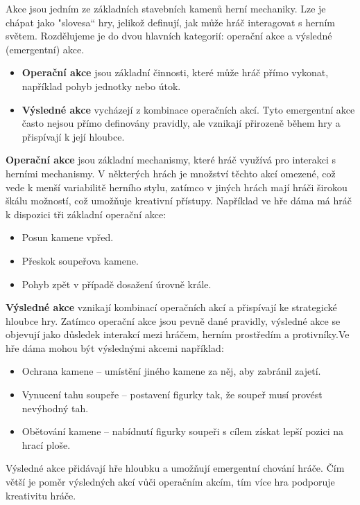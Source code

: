 Akce jsou jedním ze základních stavebních kamenů herní mechaniky. Lze je chápat jako "slovesa“ hry, jelikož definují, jak může hráč interagovat s herním světem. Rozdělujeme je do dvou hlavních kategorií: operační akce a výsledné (emergentní) akce.

\begin{itemize}
    \item \textbf{Operační akce} jsou základní činnosti, které může hráč přímo vykonat, například pohyb jednotky nebo útok.
    \item \textbf{Výsledné akce} vycházejí z kombinace operačních akcí. Tyto emergentní akce často nejsou přímo definovány pravidly, ale vznikají přirozeně během hry a přispívají k její hloubce.
\end{itemize}

\textbf{Operační akce} jsou základní mechanismy, které hráč využívá pro interakci s herními mechanismy. V některých hrách je množství těchto akcí omezené, což vede k menší variabilitě herního stylu, zatímco v jiných hrách mají hráči širokou škálu možností, což umožňuje kreativní přístupy. Například ve hře dáma má hráč k dispozici tři základní operační akce:
\begin{itemize}
    \item Posun kamene vpřed.
    \item Přeskok soupeřova kamene.
    \item Pohyb zpět v případě dosažení úrovně krále.
\end{itemize}

\textbf{Výsledné akce} vznikají kombinací operačních akcí a přispívají ke strategické hloubce hry. Zatímco operační akce jsou pevně dané pravidly, výsledné akce se objevují jako důsledek interakcí mezi hráčem, herním prostředím a protivníky.Ve hře dáma mohou být výslednými akcemi například:
\begin{itemize}
    \item Ochrana kamene -- umístění jiného kamene za něj, aby zabránil zajetí.
    \item Vynucení tahu soupeře -- postavení figurky tak, že soupeř musí provést nevýhodný tah.
    \item Obětování kamene -- nabídnutí figurky soupeři s cílem získat lepší pozici na hrací ploše.
\end{itemize}
Výsledné akce přidávají hře hloubku a umožňují emergentní chování hráče. Čím větší je poměr výsledných akcí vůči operačním akcím, tím více hra podporuje kreativitu hráče.

